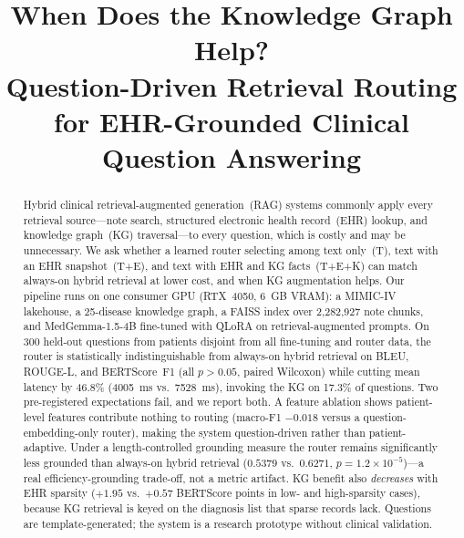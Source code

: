 \documentclass[conference]{IEEEtran}
\begin{document}
\title{When Does the Knowledge Graph Help?\\
Question-Driven Retrieval Routing for EHR-Grounded Clinical Question Answering}

\author{
}

\maketitle

\begin{abstract}
Hybrid clinical retrieval-augmented generation~(RAG) systems commonly
apply every retrieval source---note search, structured electronic
health record~(EHR) lookup, and knowledge graph~(KG) traversal---to
every question, which is costly and may be unnecessary. We ask whether
a learned router selecting among text only~(T), text with an EHR
snapshot~(T+E), and text with EHR and KG facts~(T+E+K) can match
always-on hybrid retrieval at lower cost, and when KG augmentation
helps. Our pipeline runs on one consumer GPU (RTX~4050, 6~GB VRAM):
a MIMIC-IV lakehouse, a 25-disease knowledge graph, a FAISS index over
2{,}282{,}927 note chunks, and MedGemma-1.5-4B fine-tuned with QLoRA
on retrieval-augmented prompts. On 300 held-out questions from
patients disjoint from all fine-tuning and router data, the router is
statistically indistinguishable from
always-on hybrid retrieval on BLEU, ROUGE-L, and BERTScore~F1 (all
$p > 0.05$, paired Wilcoxon) while cutting mean latency by 46.8\%
(4005~ms vs.\ 7528~ms), invoking the KG on 17.3\% of questions. Two
pre-registered expectations fail, and we report both. A feature
ablation shows patient-level features contribute nothing to routing
(macro-F1 $-0.018$ versus a question-embedding-only router), making
the system question-driven rather than patient-adaptive.
Under a length-controlled grounding measure the router remains
significantly less grounded than always-on hybrid retrieval ($0.5379$
vs.\ $0.6271$, $p = 1.2\times10^{-5}$)---a real efficiency-grounding
trade-off, not a metric artifact. KG benefit also \textit{decreases}
with EHR sparsity ($+1.95$ vs.\ $+0.57$ BERTScore points in low- and
high-sparsity cases), because KG retrieval is keyed on the diagnosis
list that sparse records lack. Questions are template-generated; the
system is a research prototype without clinical validation.
\end{abstract}
\end{document}
